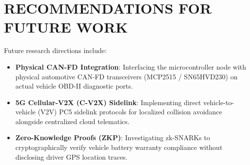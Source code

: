 \documentclass[12pt,a4paper]{report}
\begin{document}
\section{RECOMMENDATIONS FOR FUTURE WORK}
Future research directions include:
\begin{itemize}[leftmargin=1.2cm, itemsep=0.3em]
    \item \textbf{Physical CAN-FD Integration}: Interfacing the microcontroller node with physical automotive CAN-FD transceivers (MCP2515 / SN65HVD230) on actual vehicle OBD-II diagnostic ports.
    \item \textbf{5G Cellular-V2X (C-V2X) Sidelink}: Implementing direct vehicle-to-vehicle (V2V) PC5 sidelink protocols for localized collision avoidance alongside centralized cloud telematics.
    \item \textbf{Zero-Knowledge Proofs (ZKP)}: Investigating zk-SNARKs to cryptographically verify vehicle battery warranty compliance without disclosing driver GPS location traces.
\end{itemize}
\end{document}
